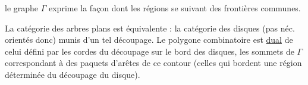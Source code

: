  le graphe $\Gamma$ exprime la façon dont les régions se  suivant des frontières communes.

La catégorie des arbres plans  est équivalente : la catégorie  des disques  (pas néc. orientés donc) munis d'un tel découpage. Le polygone combinatoire   est \uline{dual} de celui défini par les cordes du découpage sur le bord des disques, les sommets de $\Gamma$ correspondant à des paquets d'arêtes de ce contour (celles qui bordent une région déterminée du découpage  du disque).
